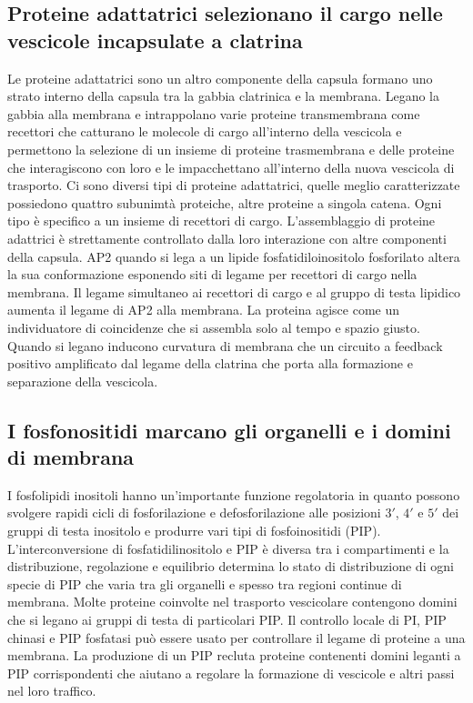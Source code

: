 \subsection{Proteine adattatrici selezionano il cargo nelle vescicole incapsulate a clatrina}
Le proteine adattatrici sono un altro componente della capsula formano uno strato interno della capsula tra la gabbia clatrinica e la membrana. Legano la gabbia alla membrana e 
intrappolano varie proteine transmembrana come recettori che catturano le molecole di cargo all'interno della vescicola e permettono la selezione di un insieme di proteine trasmembrana
e delle proteine che interagiscono con loro e le impacchettano all'interno della nuova vescicola di trasporto. Ci sono diversi tipi di proteine adattatrici, quelle meglio caratterizzate
possiedono quattro subunimt\`a proteiche, altre proteine a singola catena. Ogni tipo \`e specifico a un insieme di recettori di cargo. L'assemblaggio di proteine adattrici \`e 
strettamente controllato dalla loro interazione con altre componenti della capsula. AP2 quando si lega a un lipide fosfatidiloinositolo fosforilato altera la sua conformazione esponendo 
siti di legame per recettori di cargo nella membrana. Il legame simultaneo ai recettori di cargo e al gruppo di testa lipidico aumenta il legame di AP2 alla membrana. La proteina
agisce come un individuatore di coincidenze che si assembla solo al tempo e spazio giusto. Quando si legano inducono curvatura di membrana che un circuito a feedback 
positivo amplificato dal legame della clatrina che porta alla formazione e separazione della vescicola. 
\subsection{I fosfonositidi marcano gli organelli e i domini di membrana}
I fosfolipidi inositoli hanno un'importante funzione regolatoria in quanto possono svolgere rapidi cicli di fosforilazione e defosforilazione alle posizioni $3'$, $4'$ e $5'$ dei gruppi
di testa inositolo e produrre vari tipi di fosfoinositidi (PIP). L'interconversione di fosfatidilinositolo e PIP \`e diversa tra i compartimenti e la distribuzione, regolazione e 
equilibrio  determina lo stato di distribuzione di ogni specie di PIP che varia tra gli organelli e spesso tra regioni continue di membrana. Molte proteine coinvolte nel trasporto 
vescicolare contengono domini che si legano  ai gruppi di testa di particolari PIP. Il controllo locale di PI, PIP chinasi e PIP fosfatasi pu\`o essere usato per controllare il legame 
di proteine a una membrana. La produzione di un PIP recluta proteine contenenti domini leganti a PIP corrispondenti che aiutano a regolare la formazione di vescicole e altri passi nel
loro traffico. 
